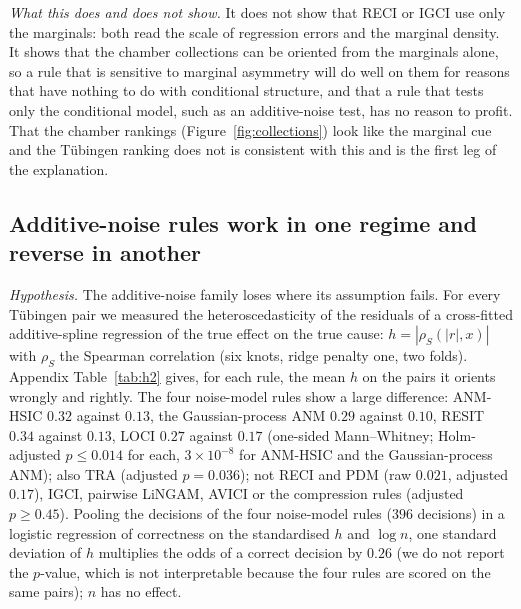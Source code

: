 \emph{What this does and does not show.} It does not show that RECI or IGCI use only the marginals: both read the scale of regression errors and the marginal density. It shows that the chamber collections can be oriented from the marginals alone, so a rule that is sensitive to marginal asymmetry will do well on them for reasons that have nothing to do with conditional structure, and that a rule that tests only the conditional model, such as an additive-noise test, has no reason to profit. That the chamber rankings (Figure~\ref{fig:collections}) look like the marginal cue and the T\"ubingen ranking does not is consistent with this and is the first leg of the explanation.

\subsection{Additive-noise rules work in one regime and reverse in another}\label{sec:regimes}
\emph{Hypothesis.} The additive-noise family loses where its assumption fails. For every T\"ubingen pair we measured the heteroscedasticity of the residuals of a cross-fitted additive-spline regression of the true effect on the true cause: $h=|\rho_S(|r|,x)|$ with $\rho_S$ the Spearman correlation (six knots, ridge penalty one, two folds). Appendix Table~\ref{tab:h2} gives, for each rule, the mean $h$ on the pairs it orients wrongly and rightly. The four noise-model rules show a large difference: ANM-HSIC $0.32$ against $0.13$, the Gaussian-process ANM $0.29$ against $0.10$, RESIT $0.34$ against $0.13$, LOCI $0.27$ against $0.17$ (one-sided Mann--Whitney; Holm-adjusted $p\le 0.014$ for each, $3\times10^{-8}$ for ANM-HSIC and the Gaussian-process ANM); also TRA (adjusted $p=0.036$); not RECI and PDM (raw $0.021$, adjusted $0.17$), IGCI, pairwise LiNGAM, AVICI or the compression rules (adjusted $p\ge 0.45$). Pooling the decisions of the four noise-model rules ($396$ decisions) in a logistic regression of correctness on the standardised $h$ and $\log n$, one standard deviation of $h$ multiplies the odds of a correct decision by $0.26$ (we do not report the $p$-value, which is not interpretable because the four rules are scored on the same pairs); $n$ has no effect.



